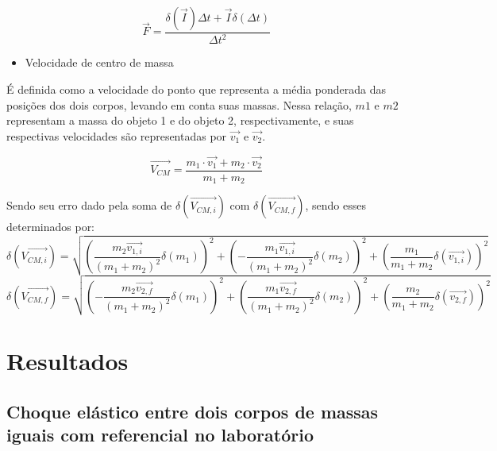 \documentclass[12pt, twoside]{article}
\begin{document}
\begin{equation}
        \label{Materiais_erro_forca_de_Contato}
            \vec{F} = \frac{\delta (\vec{I}) \Delta t + \vec{I} \delta (\Delta t)}{\Delta t^2}
        \end{equation}


        \begin{itemize}
        \item Velocidade de centro de massa
        \end{itemize}

É definida como a velocidade do ponto que representa a média ponderada das posições dos dois corpos, levando em conta suas massas.  Nessa relação, $m1$ e $m2$ representam a massa do objeto 1 e do objeto 2, respectivamente, e suas respectivas velocidades são representadas por $\vec{v_1}$ e $\vec{v_2}$.

 
        \begin{equation}
        \label{Materiais_velocidade_Centro_de_massa}
            \vec{V_{CM}} = \frac{m_1\cdot \vec{v_1} + m_2\cdot \vec{v_2}}{m_1+m_2}
        \end{equation}

Sendo seu erro dado pela soma de $\delta(\vec{V_{CM,i}})$ com $\delta(\vec{V_{CM,f}})$, sendo esses determinados por:
\begin{equation}
\label{Materiais_erro_velocidade_Centro_de_massa_simplificada_1}
\delta(\vec{V_{CM,i}}) = \sqrt{ \left( \frac{m_2 \vec{v_{1,i}}}{(m_1 + m_2)^2} \delta(m_1) \right)^2 + \left( -\frac{m_1 \vec{v_{1,i}}}{(m_1 + m_2)^2} \delta(m_2) \right)^2 + \left( \frac{m_1}{m_1 + m_2} \delta(\vec{v_{1,i}}) \right)^2 }
\end{equation}
\begin{equation}
\label{Materiais_erro_velocidade_Centro_de_massa_final_2}
\delta(\vec{V_{CM,f}}) = \sqrt{ \left( -\frac{m_2 \vec{v_{2,f}}}{(m_1 + m_2)^2} \delta(m_1) \right)^2 + \left( \frac{m_1 \vec{v_{2,f}}}{(m_1 + m_2)^2} \delta(m_2) \right)^2 + \left( \frac{m_2}{m_1 + m_2} \delta(\vec{v_{2,f}}) \right)^2 }
\end{equation}



\section{Resultados}
\subsection{Choque elástico entre dois corpos de massas iguais com referencial no laboratório}
\end{document}
